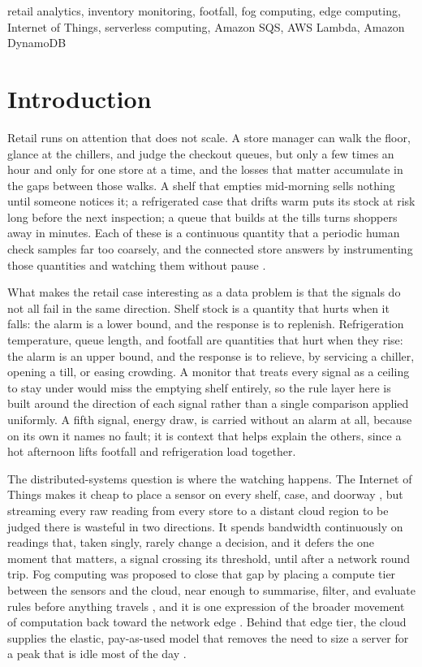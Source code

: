 \documentclass[conference]{IEEEtran}
\begin{document}
\begin{IEEEkeywords}
retail analytics, inventory monitoring, footfall, fog computing, edge computing, Internet of Things, serverless computing, Amazon SQS, AWS Lambda, Amazon DynamoDB
\end{IEEEkeywords}

\section{Introduction}

Retail runs on attention that does not scale. A store manager can walk the floor, glance at the chillers, and judge the checkout queues, but only a few times an hour and only for one store at a time, and the losses that matter accumulate in the gaps between those walks. A shelf that empties mid-morning sells nothing until someone notices it; a refrigerated case that drifts warm puts its stock at risk long before the next inspection; a queue that builds at the tills turns shoppers away in minutes. Each of these is a continuous quantity that a periodic human check samples far too coarsely, and the connected store answers by instrumenting those quantities and watching them without pause \cite{caro2019, gubbi2013}.

What makes the retail case interesting as a data problem is that the signals do not all fail in the same direction. Shelf stock is a quantity that hurts when it falls: the alarm is a lower bound, and the response is to replenish. Refrigeration temperature, queue length, and footfall are quantities that hurt when they rise: the alarm is an upper bound, and the response is to relieve, by servicing a chiller, opening a till, or easing crowding. A monitor that treats every signal as a ceiling to stay under would miss the emptying shelf entirely, so the rule layer here is built around the direction of each signal rather than a single comparison applied uniformly. A fifth signal, energy draw, is carried without an alarm at all, because on its own it names no fault; it is context that helps explain the others, since a hot afternoon lifts footfall and refrigeration load together.

The distributed-systems question is where the watching happens. The Internet of Things makes it cheap to place a sensor on every shelf, case, and doorway \cite{atzori2010}, but streaming every raw reading from every store to a distant cloud region to be judged there is wasteful in two directions. It spends bandwidth continuously on readings that, taken singly, rarely change a decision, and it defers the one moment that matters, a signal crossing its threshold, until after a network round trip. Fog computing was proposed to close that gap by placing a compute tier between the sensors and the cloud, near enough to summarise, filter, and evaluate rules before anything travels \cite{bonomi2012, yousefpour2019}, and it is one expression of the broader movement of computation back toward the network edge \cite{shi2016, satyanarayanan2017}. Behind that edge tier, the cloud supplies the elastic, pay-as-used model that removes the need to size a server for a peak that is idle most of the day \cite{armbrust2010}.
\end{document}
